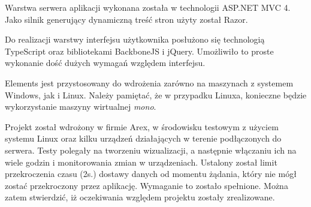 Warstwa serwera aplikacji wykonana została w technologii ASP.NET MVC 4. Jako silnik generujący dynamiczną treść stron użyty został Razor. 

Do realizacji warstwy interfejsu użytkownika posłużono się technologią TypeScript oraz bibliotekami BackboneJS i jQuery. Umożliwiło to proste wykonanie dość dużych wymagań względem interfejsu.

Elements jest przystosowany do wdrożenia zarówno na maszynach z systemem Windows, jak i Linux. Należy pamiętać, że w przypadku Linuxa, konieczne będzie wykorzystanie maszyny wirtualnej \textit{mono}.

Projekt został wdrożony w firmie Arex, w środowisku testowym z użyciem systemu Linux oraz kilku urządzeń działających w terenie podłączonych do serwera. Testy polegały na tworzeniu wizualizacji, a następnie włączaniu ich na wiele godzin i monitorowania zmian w urządzeniach. Ustalony został limit przekroczenia czasu (2s.) dostawy danych od momentu żądania, który nie mógł zostać przekroczony przez aplikację. Wymaganie to zostało spełnione. Można zatem stwierdzić, iż oczekiwania względem projektu zostały zrealizowane.